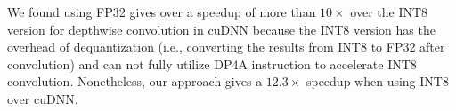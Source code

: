  We found using FP32 gives over a speedup of more than $10\times$ over the INT8 version for depthwise
convolution in cuDNN because the INT8 version has the overhead of dequantization (i.e., converting the results from INT8 to FP32 after convolution) and can not fully utilize DP4A instruction to accelerate INT8 convolution.
Nonetheless, our approach gives a $12.3\times$ speedup when using INT8 over cuDNN.





